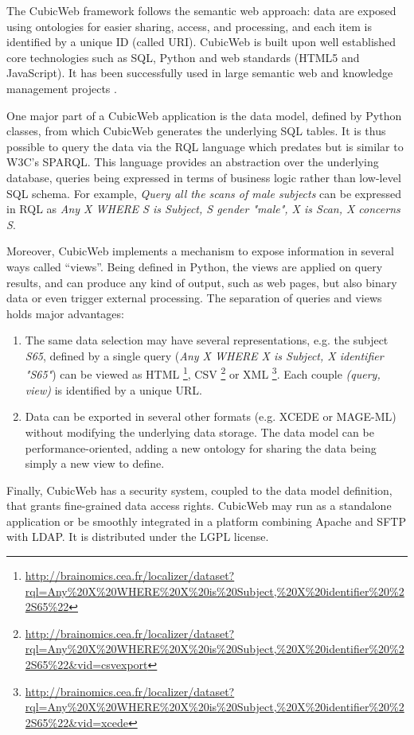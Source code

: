 \documentclass[review]{elsarticle}
\begin{document}
The CubicWeb framework \cite{CubicWeb} follows the semantic web approach: data are exposed using ontologies for easier sharing, access, and processing, and each item is identified by a unique ID (called URI). CubicWeb is built upon well established core technologies such as SQL, Python and web standards (HTML5 and JavaScript). It has been successfully used in large semantic web and knowledge management projects \cite{Simon2013}.

One major part of a CubicWeb application is the data model, defined by Python classes, from which CubicWeb generates the underlying SQL tables. It is thus possible to query the data via the RQL language which predates but is similar to W3C's SPARQL. This language provides an abstraction over the underlying database, queries being expressed in terms of business logic rather than low-level SQL schema. For example, \emph{Query all the scans of male subjects} can be expressed in RQL as \emph{Any X WHERE S is Subject, S gender "male", X is Scan, X concerns S}.

Moreover, CubicWeb implements a mechanism to expose information in several ways called ``views''. Being defined in Python, the views are applied on query results, and can produce any kind of output, such as web pages, but also binary data or even trigger external processing. The separation of queries and views holds major advantages:
\begin{enumerate}[label=\roman*)]
\item The same data selection may have several representations, e.g. the subject \emph{S65}, defined by a single query (\emph{Any X WHERE X is Subject, X identifier "S65"}) can be viewed as HTML \footnote{\url{http://brainomics.cea.fr/localizer/dataset?rql=Any\%20X\%20WHERE\%20X\%20is\%20Subject,\%20X\%20identifier\%20\%22S65\%22}}, CSV \footnote{\url{http://brainomics.cea.fr/localizer/dataset?rql=Any\%20X\%20WHERE\%20X\%20is\%20Subject,\%20X\%20identifier\%20\%22S65\%22&vid=csvexport}} or XML \footnote{\url{http://brainomics.cea.fr/localizer/dataset?rql=Any\%20X\%20WHERE\%20X\%20is\%20Subject,\%20X\%20identifier\%20\%22S65\%22&vid=xcede}}. Each couple \emph{(query, view)} is identified by a unique URL.
\item Data can be exported in several other formats (e.g. XCEDE or MAGE-ML) without modifying the underlying data storage. The data model can be performance-oriented, adding a new ontology for sharing the data being simply a new view to define.
\end{enumerate}
Finally, CubicWeb has a security system, coupled to the data model definition, that grants fine-grained data access rights. CubicWeb may run as a standalone application or be smoothly integrated in a platform combining Apache and SFTP with LDAP. It is distributed under the LGPL license.
\end{document}
